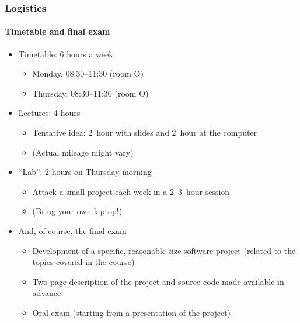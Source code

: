 \documentclass[9pt]{beamer}
\begin{document}
\begin{frame}
  \frametitle{Logistics}
  \framesubtitle{Timetable and final exam}
  \begin{itemize}
  \item Timetable: 6 hours a week
    \begin{itemize}
    \item Monday, 08:30--11:30 (room O)
    \item Thursday, 08:30--11:30 (room O)
    \end{itemize}
  \item Lectures: 4 hours
    \begin{itemize}
    \item Tentative idea: 2~hour with slides and $2$~hour at the computer
    \item (Actual mileage might vary)
    \end{itemize}
  \item ``Lab'': 2 hours on Thursday morning
    \begin{itemize}
    \item Attack a small project each week in a 2--3~hour session
    \item (Bring your own laptop!)
    \end{itemize}
  \item \alert{And, of course, the final exam}
    \begin{itemize}
    \item Development of a specific, reasonable-size software project
      (related to the topics covered in the course)
    \item Two-page description of the project and source code made
      available in advance
    \item Oral exam (starting from a presentation of the project)
    \end{itemize}
  \end{itemize}
\end{frame}
\end{document}
